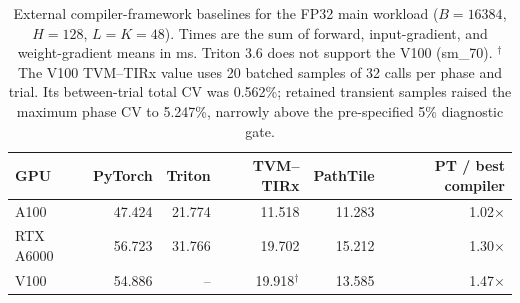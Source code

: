 \begin{table}[t]
\centering
\caption{External compiler-framework baselines for the FP32 main workload ($B{=}16384$, $H{=}128$, $L{=}K{=}48$). Times are the sum of forward, input-gradient, and weight-gradient means in ms. Triton 3.6 does not support the V100 (sm\_70). $^{\dagger}$The V100 TVM--TIRx value uses 20 batched samples of 32 calls per phase and trial. Its between-trial total CV was 0.562\%; retained transient samples raised the maximum phase CV to 5.247\%, narrowly above the pre-specified 5\% diagnostic gate.}
\label{tab:external-framework-baselines}
\begin{tabular}{lrrrrr}
\toprule
GPU & PyTorch & Triton & TVM--TIRx & PathTile & PT / best compiler \\
\midrule
A100 & 47.424 & 21.774 & 11.518 & 11.283 & 1.02$\times$ \\
RTX A6000 & 56.723 & 31.766 & 19.702 & 15.212 & 1.30$\times$ \\
V100 & 54.886 & -- & 19.918$^{\dagger}$ & 13.585 & 1.47$\times$ \\
\bottomrule
\end{tabular}
\end{table}
